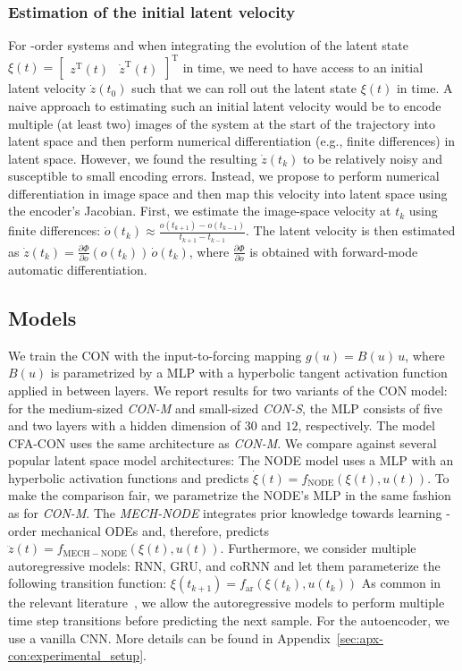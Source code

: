 \subsubsection{Estimation of the initial latent velocity}\label{sub:con:initial_latent_velocity_estimation}
For -order systems and when integrating the evolution of the latent state $\xi(t) = \begin{bmatrix}
    z^\mathrm{T}(t) & \dot{z}^\mathrm{T}(t)
\end{bmatrix}^\mathrm{T}$ in time, we need to have access to an initial latent velocity $\dot{z}(t_0)$ such that we can roll out the latent state $\xi(t)$ in time.
A naive approach to estimating such an initial latent velocity would be to encode multiple (at least two) images of the system at the start of the trajectory into latent space and then perform numerical differentiation (e.g., finite differences) in latent space. However, we found the resulting $\dot{z}(t_k)$ to be relatively noisy and susceptible to small encoding errors.
Instead, we propose to perform numerical differentiation in image space and then map this velocity into latent space using the encoder's Jacobian. First, we estimate the image-space velocity at $t_k$ using finite differences: $\dot{o}(t_k) \approx \frac{o(t_{k+1}) - o(t_{k-1})}{t_{k+1} - t_{k-1}}$. The latent velocity is then estimated as $\dot{z}(t_k) = \frac{\partial \Phi}{\partial o} (o(t_k)) \, \dot{o}(t_k)$, where $\frac{\partial \Phi}{\partial o}$ is obtained with forward-mode automatic differentiation.

\subsection{Models} 
We train the \gls{CON} with the input-to-forcing mapping $g(u) = B(u) \, u$, where $B(u)$ is parametrized by a \gls{MLP} with a hyperbolic tangent activation function applied in between layers. We report results for two variants of the \gls{CON} model: for the medium-sized \emph{CON-M} and small-sized \emph{CON-S}, the \gls{MLP} consists of five and two layers with a hidden dimension of $30$ and $12$, respectively. The model \gls{CFA-CON} uses the same architecture as \emph{CON-M}. We compare %
against several popular latent space model architectures:
The \gls{NODE} model uses a \gls{MLP} with an hyperbolic activation functions and predicts $\dot{\xi}(t) = f_\mathrm{NODE}(\xi(t), u(t))$. To make the comparison fair, we parametrize the NODE's \gls{MLP} in the same fashion as for \emph{CON-M}. The \emph{MECH-NODE} integrates prior knowledge towards learning -order mechanical \glspl{ODE} and, therefore, predicts $\ddot{z}(t) = f_\mathrm{MECH-NODE}(\xi(t), u(t))$. 
Furthermore, we consider multiple autoregressive models: \gls{RNN}, \gls{GRU}, and \gls{coRNN} and let them parameterize the following transition function: $\xi(t_{k+1}) = f_\mathrm{ar}(\xi(t_k), u(t_k))$
As common in the relevant literature~\cite{botev2021priors}, we allow the autoregressive models to perform multiple time step transitions before predicting the next sample.
For the autoencoder, we use a vanilla \gls{CNN}. More details can be found in Appendix~\ref{sec:apx-con:experimental_setup}.

